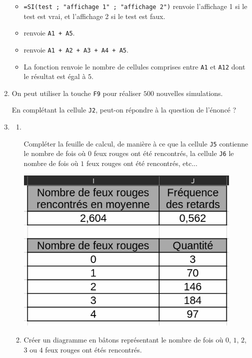 \documentclass[
	classe=$1^{ere}STI2D$,
	grayscale
]{informatique}
\begin{document}
\begin{enumerate}
\begin{minipage}{0.45\textwidth}
\begin{tcolorbox}
			      \begin{itemize}
				      \item \texttt{=SI(test ; "affichage 1" ; "affichage 2")} renvoie l'affichage 1 si le test est vrai, et l'affichage 2 si le test est faux.
				      \item {} renvoie \texttt{A1 + A5}.
				      \item {} renvoie \texttt{A1 + A2 + A3 + A4 + A5}.
				      \item La fonction  renvoie le nombre de cellules comprises entre \texttt{A1} et \texttt{A12} dont le résultat est égal à $5$.
			      \end{itemize}
		      \end{tcolorbox}
	      \end{minipage}
	\item On peut utiliser la touche \texttt{F9} pour réaliser $500$ nouvelles simulations.

	      En complétant la cellule \texttt{J2}, peut-on répondre à la question de l'énoncé ?
	\item \begin{enumerate}
		      \item \

		            \begin{minipage}{0.55\textwidth}
			            Compléter la feuille de calcul, de manière à ce que la cellule \texttt{J5} contienne le nombre de fois où $0$ feux rouges ont été rencontrés, la cellule \texttt{J6} le nombre de fois où $1$ feux rouges ont été rencontrés, etc...
		            \end{minipage}\hspace{0.02\textwidth}
		            \begin{minipage}{0.4\textwidth}
			            \includegraphics[width=0.9\textwidth]{Images/Tableur feux rouges + quantités (gris).png}
		            \end{minipage}
		      \item Créer un diagramme en bâtons représentant le nombre de fois où $0$, $1$, $2$, $3$ ou $4$ feux rouges ont étés rencontrés.
	      \end{enumerate}
\end{enumerate}
\end{document}
